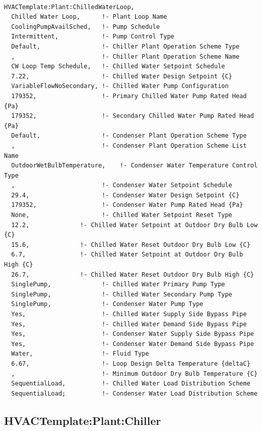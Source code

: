 \begin{lstlisting}

HVACTemplate:Plant:ChilledWaterLoop,
  Chilled Water Loop,      !- Plant Loop Name
  CoolingPumpAvailSched,   !- Pump Schedule
  Intermittent,            !- Pump Control Type
  Default,                 !- Chiller Plant Operation Scheme Type
  ,                        !- Chiller Plant Operation Scheme Name
  CW Loop Temp Schedule,   !- Chilled Water Setpoint Schedule
  7.22,                    !- Chilled Water Design Setpoint {C}
  VariableFlowNoSecondary, !- Chilled Water Pump Configuration
  179352,                  !- Primary Chilled Water Pump Rated Head {Pa}
  179352,                  !- Secondary Chilled Water Pump Rated Head {Pa}
  Default,                 !- Condenser Plant Operation Scheme Type
  ,                        !- Condenser Plant Operation Scheme List Name
  OutdoorWetBulbTemperature,    !- Condenser Water Temperature Control Type
  ,                        !- Condenser Water Setpoint Schedule
  29.4,                    !- Condenser Water Design Setpoint {C}
  179352,                  !- Condenser Water Pump Rated Head {Pa}
  None,                    !- Chilled Water Setpoint Reset Type
  12.2,              !- Chilled Water Setpoint at Outdoor Dry Bulb Low {C}
  15.6,              !- Chilled Water Reset Outdoor Dry Bulb Low {C}
  6.7,               !- Chilled Water Setpoint at Outdoor Dry Bulb High {C}
  26.7,              !- Chilled Water Reset Outdoor Dry Bulb High {C}
  SinglePump,              !- Chilled Water Primary Pump Type
  SinglePump,              !- Chilled Water Secondary Pump Type
  SinglePump,              !- Condenser Water Pump Type
  Yes,                     !- Chilled Water Supply Side Bypass Pipe
  Yes,                     !- Chilled Water Demand Side Bypass Pipe
  Yes,                     !- Condenser Water Supply Side Bypass Pipe
  Yes,                     !- Condenser Water Demand Side Bypass Pipe
  Water,                   !- Fluid Type
  6.67,                    !- Loop Design Delta Temperature {deltaC}
  ,                        !- Minimum Outdoor Dry Bulb Temperature {C}
  SequentialLoad,          !- Chilled Water Load Distribution Scheme
  SequentialLoad;          !- Condenser Water Load Distribution Scheme
\end{lstlisting}

\subsection{HVACTemplate:Plant:Chiller}\label{hvactemplateplantchiller}

